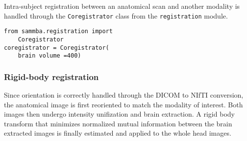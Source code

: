 \documentclass[utf8, a4paper, final, crop]{frontiersSCNS}
\newcommand{\pythoninline}[1]{\texttt{#1}}
\begin{document}

Intra-subject registration between an anatomical scan and another modality
is handled through the \pythoninline{Coregistrator} class from the
\pythoninline{registration} module. 
\begin{verbatim}
from sammba.registration import 
    Coregistrator
coregistrator = Coregistrator(
    brain volume =400)
\end{verbatim}

\subsubsection{Rigid-body registration}
Since orientation is correctly handled through the DICOM to NIfTI conversion,
the anatomical image is first reoriented to match the modality of interest.
Both images then undergo intensity unifization and brain extraction.
A rigid body
transform that minimizes normalized mutual information
between the brain extracted images is finally estimated and applied to the whole head images.
\end{document}
